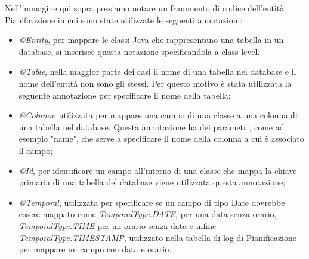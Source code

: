 \noindent Nell'immagine qui sopra possiamo notare un frammento di codice dell'entità Pianificazione in cui sono state utilizzate le seguenti annotazioni:
\begin{itemize}
\item \textit{@Entity}, per mappare le classi Java che rappresentano una tabella in un database, si inserisce questa notazione specificandola a class level.
\item \textit{@Table}, nella maggior parte dei casi il nome di una tabella nel database e il nome dell'entità non sono gli stessi. Per questo motivo è stata utilizzata la seguente annotazione per specificare il nome della tabella;
\item \textit{@Column}, utilizzata per mappare una campo di una classe a una colonna di una tabella nel database. Questa annotazione ha dei parametri, come ad esempio "name", che serve a specificare il nome della colonna a cui è associato il campo;
\item \textit{@Id}, per identificare un campo all'interno di una classe che mappa la chiave primaria di una tabella del database viene utilizzata questa annotazione;
\item \textit{@Temporal}, utilizzata per specificare se un campo di tipo Date dovrebbe essere mappato come \textit{TemporalType.DATE}, per una data senza orario, \textit{TemporalType.TIME} per un orario senza data e infine \textit{TemporalType.TIMESTAMP}, utilizzato nella tabella di log di Pianificazione per mappare un campo con data e orario.
\end{itemize}
